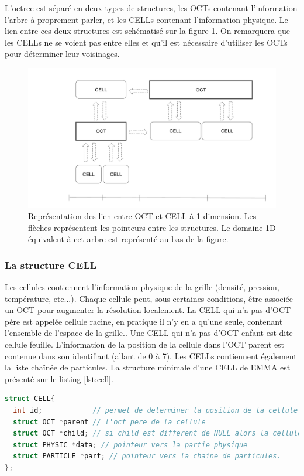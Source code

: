 L'octree est séparé en deux types de structures, les OCTs contenant l'information l'arbre à proprement parler, et les CELLs contenant l'information physique.
Le lien entre ces deux structures est schématisé sur la figure \ref{fig:octcell}.
On remarquera que les CELLs ne se voient pas entre elles et qu'il est nécessaire d'utiliser les OCTs pour déterminer leur voisinages.

\begin{figure}
        \includegraphics[width=.95\linewidth]{img/02/octcell.pdf} 
        \caption[OCT et CELL]{Représentation des lien entre OCT et CELL à 1 dimension.
        Les flèches représentent les pointeurs entre les structures.
        Le domaine 1D équivalent à cet arbre est représenté au bas de la figure.
     	\label{fig:octcell}
}
\end{figure}


\subsubsection{La structure CELL}
\label{sec:CELL}
Les cellules contiennent l'information physique de la grille (densité, pression, température, etc...).
Chaque cellule peut, sous certaines conditions, être associée un OCT pour augmenter la résolution localement.
La CELL qui n'a pas d'OCT père est appelée cellule racine, en pratique il n'y en a qu'une seule, contenant l'ensemble de l'espace de la grille..
Une CELL qui n'a pas d'OCT enfant est dite cellule feuille.
L'information de la position de la cellule dans l'OCT parent est contenue dans son identifiant (allant de 0 à 7).
Les CELLs contiennent également la liste chaînée de particules.
La structure minimale d'une CELL de EMMA est présenté sur le listing \ref{lst:cell}.

\begin{lstlisting}[float=bth,language=C,frame=tb,caption={La structure CELL de EMMA},label=lst:cell]
struct CELL{
  int id;            // permet de determiner la position de la cellule dans l'oct
  struct OCT *parent // l'oct pere de la cellule
  struct OCT *child; // si child est different de NULL alors la cellule est raffinee et child point vers l'oct enfant
  struct PHYSIC *data; // pointeur vers la partie physique
  struct PARTICLE *part; // pointeur vers la chaine de particules.
};
\end{lstlisting}



